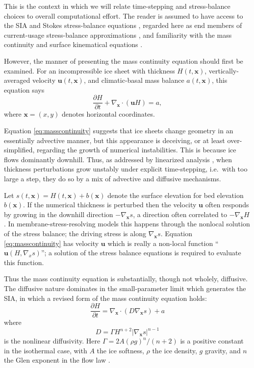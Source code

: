 \documentclass[twocolumn,letterpaper]{igs}
\newcommand\bu{\mathbf{u}}
\newcommand\bx{\mathbf{x}}
\newcommand{\grad}{\nabla}
\newcommand{\Divx}{\nabla_\bx \cdot}
\newcommand{\gradx}{\nabla_\bx}
\begin{document}
This is the context in which we will relate time-stepping and stress-balance choices to overall computational effort.  The reader is assumed to have access to the SIA and Stokes stress-balance equations \citep{GreveBlatter2009,SchoofHewitt2013}, regarded here as end members of current-usage stress-balance approximations \citep{Robinsonetal2022}, and familiarity with the mass continuity and surface kinematical equations \citep{GreveBlatter2009}.

However, the manner of presenting the mass continuity equation should first be examined.  For an incompressible ice sheet with thickness $H(t,\bx)$, vertically-averaged velocity $\bu(t,\bx)$, and climatic-basal mass balance $a(t,\bx)$, this equation says
\begin{equation}
\frac{\partial H}{\partial t} + \Divx \left(\bu H\right) = a, \label{eq:masscontinuity}
\end{equation}
where $\bx=(x,y)$ denotes horizontal coordinates.

Equation \eqref{eq:masscontinuity} suggests that ice sheets change geometry in an essentially advective manner, but this appearance is deceiving, or at least over-simplified, regarding the growth of numerical instabilities.  This is because ice flows dominantly downhill.  Thus, as addressed by linearized analysis \citep{Chengetal2017,Robinsonetal2022}, when thickness perturbations grow unstably under explicit time-stepping, i.e.~with too large a step, they do so by a mix of advective and diffusive mechanisms.

Let $s(t,\bx)=H(t,\bx)+b(\bx)$ denote the surface elevation for bed elevation $b(\bx)$.  If the numerical thickness is perturbed then the velocity $\bu$ often responds by growing in the downhill direction $-\gradx s$, a direction often correlated to $-\gradx H$.  In membrane-stress-resolving models this happens through the nonlocal solution of the stress balance; the driving stress is along $\gradx s$.  Equation \eqref{eq:masscontinuity} has velocity $\bu$ which is really a non-local function ``$\bu(H,\grad_x s)$''; a solution of the stress balance equations is required to evaluate this function.

Thus the mass continuity equation is substantially, though not wholely, diffusive.  The diffusive nature dominates in the small-parameter limit which generates the SIA, in which a revised form of the mass continuity equation holds:
\begin{equation}
\frac{\partial H}{\partial t} = \Divx \left(D \gradx s \right) + a  \label{eq:siamasscontinuity}
\end{equation}
where
\begin{equation}
D = \Gamma H^{n+2} |\gradx s|^{n-1} \label{eq:siadiffusivity}
\end{equation}
is the nonlinear diffusivity.  Here $\Gamma = 2 A (\rho g)^n/(n+2)$ is a positive constant in the isothermal case, with $A$ the ice softness, $\rho$ the ice density, $g$ gravity, and $n$ the Glen exponent in the flow law \citep{GreveBlatter2009}.
\end{document}
